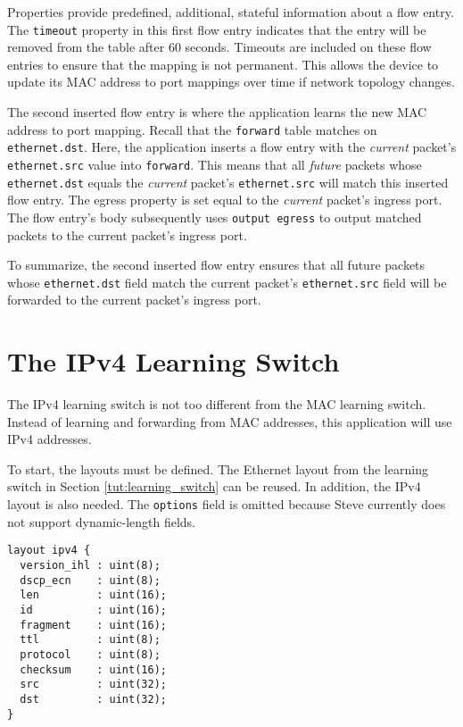 Properties provide predefined, additional, stateful information about a flow entry. The \texttt{timeout} property in this first flow entry indicates that the entry will be removed from the table after 60 seconds. Timeouts are included on these flow entries to ensure that the
mapping is not permanent. This allows the device to update its
MAC address to port mappings over time if network topology changes.

The second inserted flow entry is where the application
learns the new MAC address to port mapping.
Recall that the \texttt{forward} table matches on \texttt{ethernet.dst}.
Here, the application inserts a flow entry with the \textit{current} packet's 
\texttt{ethernet.src} value into \texttt{forward}.
This means that all \textit{future} packets whose
\texttt{ethernet.dst} equals the \textit{current} packet's \texttt{ethernet.src}
will match this inserted flow entry. 
The egress property is set equal to the
\textit{current} packet's ingress port. The flow entry's body subsequently uses
\texttt{output egress} to output matched packets to the current packet's ingress port.

To summarize, the second inserted flow entry ensures that all future packets whose
\texttt{ethernet.dst} field match the current packet's \texttt{ethernet.src}
field will be forwarded to the current packet's ingress port. 


\section{The IPv4 Learning Switch} \label{tut:learning_router}

The IPv4 learning switch is not too different from the MAC learning switch. 
Instead of learning and forwarding from MAC addresses, this application will use 
IPv4 addresses.

To start, the layouts must be defined. The Ethernet layout
from the learning switch in Section \ref{tut:learning_switch} can be reused. 
In addition, the IPv4 layout is also needed. The \texttt{options} field is omitted because Steve currently does not support dynamic-length fields.

\begin{codepage}
\begin{lstlisting}
layout ipv4 {
  version_ihl : uint(8);
  dscp_ecn    : uint(8);
  len         : uint(16);
  id          : uint(16);
  fragment    : uint(16);
  ttl         : uint(8);
  protocol    : uint(8);
  checksum    : uint(16);
  src         : uint(32);
  dst         : uint(32);
}
\end{lstlisting}
\end{codepage}

